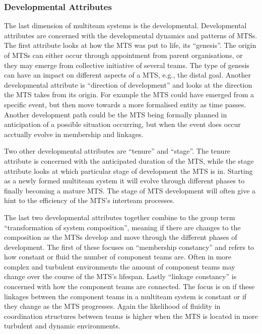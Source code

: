 \subsubsection{Developmental Attributes}

The last dimension of multiteam systems is the developmental. Developmental attributes are concerned with the developmental dynamics and patterns of MTSs. The first attribute looks at how the MTS was put to life, its ``genesis''. The origin of MTSs can either occur through appointment from parent organisations, or they may emerge from collective initiative of several teams. The type of genesis can have an impact on different aspects of a MTS, e.g., the distal goal. Another developmental attribute is ``direction of development'' and looks at the direction the MTS takes from its origin. For example the MTS could have emerged from a specific event, but then move towards a more formalised entity as time passes. Another development path could be the MTS being formally planned in anticipation of a possible situation occurring, but when the event does occur acctually evolve in membership and linkages.

Two other developmental attributes are ``tenure'' and ``stage''. The tenure attribute is concerned with the anticipated  duration of the MTS, while the stage attribute looks at which particular stage of development the MTS is in. Starting as a newly formed multiteam system it will evolve through different phases to finally becoming a mature MTS. The stage of MTS development will often give a hint to the efficiency of the MTS's interteam processes. 

The last two developmental attributes together combine to the group term ``transformation of system composition'', meaning if there are changes to the composition as the MTSs develop and move through the different phases of development. The first of these focuses on ``membership constancy'' and refers to how constant or fluid the number of component teams are. Often in more complex and turbulent environments the amount of component teams may change over the course of the MTS's lifespan. Lastly ``linkage constancy'' is concerned with how the component teams are connected. The focus is on if these linkages between the component teams in a multiteam system is constant or if they change as the MTS progresses. Again the likelihood of fluidity in coordination structures between teams is higher when the MTS is located in more turbulent and dynamic environments.

